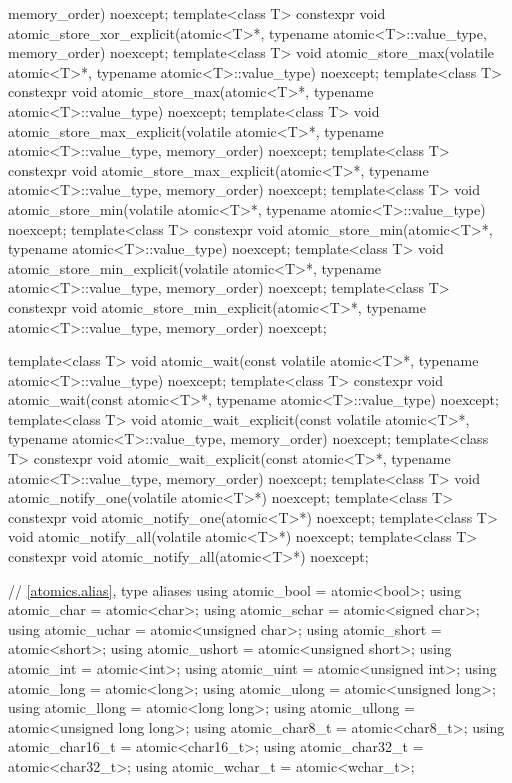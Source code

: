 \begin{codeblock}
{                                   memory_order) noexcept;
  template<class T>
    constexpr void atomic_store_xor_explicit(atomic<T>*, typename atomic<T>::value_type,
                                             memory_order) noexcept;
  template<class T>
    void atomic_store_max(volatile atomic<T>*, typename atomic<T>::value_type) noexcept;
  template<class T>
    constexpr void atomic_store_max(atomic<T>*, typename atomic<T>::value_type) noexcept;
  template<class T>
    void atomic_store_max_explicit(volatile atomic<T>*, typename atomic<T>::value_type,
                                   memory_order) noexcept;
  template<class T>
    constexpr void atomic_store_max_explicit(atomic<T>*, typename atomic<T>::value_type,
                                             memory_order) noexcept;
  template<class T>
    void atomic_store_min(volatile atomic<T>*, typename atomic<T>::value_type) noexcept;
  template<class T>
    constexpr void atomic_store_min(atomic<T>*, typename atomic<T>::value_type) noexcept;
  template<class T>
    void atomic_store_min_explicit(volatile atomic<T>*, typename atomic<T>::value_type,
                                   memory_order) noexcept;
  template<class T>
    constexpr void atomic_store_min_explicit(atomic<T>*, typename atomic<T>::value_type,
                                             memory_order) noexcept;

  template<class T>
    void atomic_wait(const volatile atomic<T>*, typename atomic<T>::value_type) noexcept;
  template<class T>
    constexpr void atomic_wait(const atomic<T>*, typename atomic<T>::value_type) noexcept;
  template<class T>
    void atomic_wait_explicit(const volatile atomic<T>*, typename atomic<T>::value_type,
                              memory_order) noexcept;
  template<class T>
    constexpr void atomic_wait_explicit(const atomic<T>*, typename atomic<T>::value_type,
                                        memory_order) noexcept;
  template<class T>
    void atomic_notify_one(volatile atomic<T>*) noexcept;
  template<class T>
    constexpr void atomic_notify_one(atomic<T>*) noexcept;
  template<class T>
    void atomic_notify_all(volatile atomic<T>*) noexcept;
  template<class T>
    constexpr void atomic_notify_all(atomic<T>*) noexcept;

  // \ref{atomics.alias}, type aliases
  using atomic_bool           = atomic<bool>;
  using atomic_char           = atomic<char>;
  using atomic_schar          = atomic<signed char>;
  using atomic_uchar          = atomic<unsigned char>;
  using atomic_short          = atomic<short>;
  using atomic_ushort         = atomic<unsigned short>;
  using atomic_int            = atomic<int>;
  using atomic_uint           = atomic<unsigned int>;
  using atomic_long           = atomic<long>;
  using atomic_ulong          = atomic<unsigned long>;
  using atomic_llong          = atomic<long long>;
  using atomic_ullong         = atomic<unsigned long long>;
  using atomic_char8_t        = atomic<char8_t>;
  using atomic_char16_t       = atomic<char16_t>;
  using atomic_char32_t       = atomic<char32_t>;
  using atomic_wchar_t        = atomic<wchar_t>;

}
\end{codeblock}
